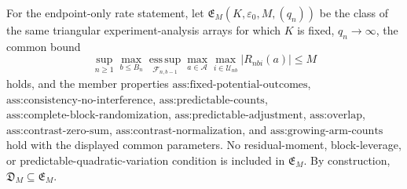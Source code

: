 For the endpoint-only rate statement, let \(\mathfrak E_M(K,\varepsilon_0,M,(q_n))\) be the class of the same triangular experiment-analysis arrays for which \(K\) is fixed, \(q_n\to\infty\), the common bound
\[
\sup_{n\ge1}\max_{b\le B_n}\operatorname*{ess\,sup}_{\mathcal F_{n,b-1}}
\max_{a\in\mathcal A}\max_{i\in\mathcal U_{nb}}|R_{nbi}(a)|\le M
\]
holds, and the member properties \(\text{ass:fixed-potential-outcomes}\), \(\text{ass:consistency-no-interference}\), \(\text{ass:predictable-counts}\), \(\text{ass:complete-block-randomization}\), \(\text{ass:predictable-adjustment}\), \(\text{ass:overlap}\), \(\text{ass:contrast-zero-sum}\), \(\text{ass:contrast-normalization}\), and \(\text{ass:growing-arm-counts}\) hold with the displayed common parameters. No residual-moment, block-leverage, or predictable-quadratic-variation condition is included in \(\mathfrak E_M\). By construction, \(\mathfrak D_M\subseteq\mathfrak E_M\).